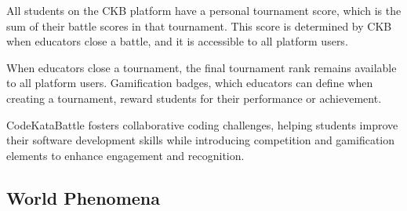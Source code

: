 All students on the CKB platform have a personal tournament score, which is the sum of their battle scores in that tournament.
This score is determined by CKB when educators close a battle, and it is accessible to all platform users.

When educators close a tournament, the final tournament rank remains available to all platform users.
Gamification badges, which educators can define when creating a tournament, reward students for their performance or achievement.

CodeKataBattle fosters collaborative coding challenges, helping students improve their software development skills while introducing competition and gamification elements to enhance engagement and recognition.

\subsection{World Phenomena}

